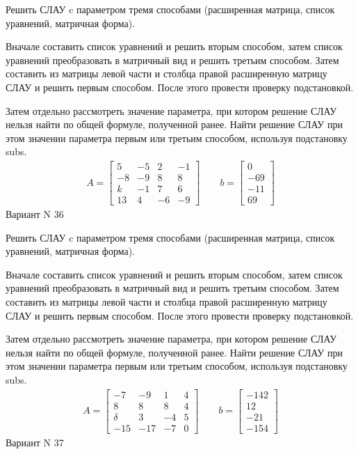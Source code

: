 \documentclass[11pt]{report}
\begin{document}
Решить СЛАУ c параметром тремя способами (расширенная матрица, список уравнений, матричная форма).

Вначале составить список уравнений и решить вторым способом,
затем список уравнений преобразовать в матричный вид и решить третьим способом.
Затем составить из матрицы левой части и столбца правой расширенную матрицу СЛАУ и решить первым способом.
После этого провести проверку подстановкой.

Затем отдельно рассмотреть значение параметра, при котором решение СЛАУ нельзя найти по общей формуле,
полученной ранее.
Найти решение СЛАУ при этом значении параметра первым или третьим способом, используя подстановку subs.
\begin{align*}
    A = \left[\begin{matrix}5 & -5 & 2 & -1\\-8 & -9 & 8 & 8\\k & -1 & 7 & 6\\13 & 4 & -6 & -9\end{matrix}\right]
\qquad b = \left[\begin{matrix}0\\-69\\-11\\69\end{matrix}\right]
\end{align*}
\newpage
Вариант N 36


Решить СЛАУ c параметром тремя способами (расширенная матрица, список уравнений, матричная форма).

Вначале составить список уравнений и решить вторым способом,
затем список уравнений преобразовать в матричный вид и решить третьим способом.
Затем составить из матрицы левой части и столбца правой расширенную матрицу СЛАУ и решить первым способом.
После этого провести проверку подстановкой.

Затем отдельно рассмотреть значение параметра, при котором решение СЛАУ нельзя найти по общей формуле,
полученной ранее.
Найти решение СЛАУ при этом значении параметра первым или третьим способом, используя подстановку subs.
\begin{align*}
    A = \left[\begin{matrix}-7 & -9 & 1 & 4\\8 & 8 & 8 & 4\\\delta & 3 & -4 & 5\\-15 & -17 & -7 & 0\end{matrix}\right]
\qquad b = \left[\begin{matrix}-142\\12\\-21\\-154\end{matrix}\right]
\end{align*}
\newpage
Вариант N 37
\end{document}
